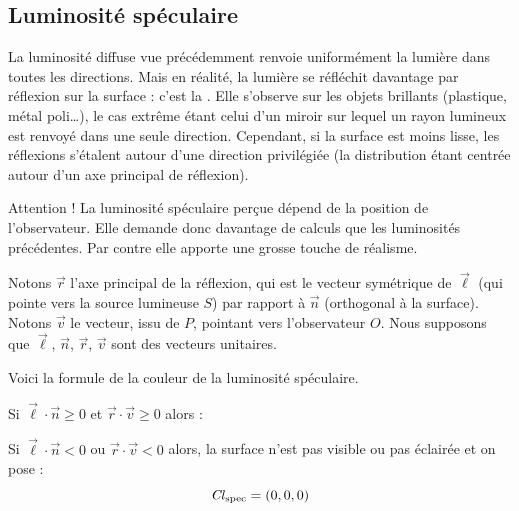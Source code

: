 \documentclass[11pt,class=report,crop=false]{standalone}
\begin{document}
\subsection{Luminosité spéculaire}


La luminosité diffuse vue précédemment renvoie uniformément la lumière dans toutes les directions. Mais en réalité, la lumière se réfléchit davantage par réflexion sur la surface : c'est la .
Elle s'observe sur les objets brillants (plastique, métal poli\ldots), le cas extrême étant celui d'un miroir sur lequel un rayon lumineux est renvoyé dans une seule direction. Cependant, si la surface est moins lisse, les réflexions s'étalent autour d'une direction privilégiée (la distribution étant centrée autour d'un axe principal de réflexion).



Attention ! La luminosité spéculaire perçue dépend de la position de l'observateur. Elle demande donc davantage de calculs que les luminosités précédentes. Par contre elle apporte une grosse touche de réalisme.

Notons $\vec r$ l'axe principal de la réflexion, qui est le vecteur symétrique de $\vec\ell$ (qui pointe vers la source lumineuse $S$) par rapport à $\vec n$ (orthogonal à la surface). Notons $\vec{v}$ le vecteur, issu de $P$, pointant vers l'observateur $O$.
Nous supposons que $\vec{\ell}$, $\vec{n}$, $\vec{r}$, $\vec{v}$ sont des vecteurs unitaires.



\begin{lemme}
\label{lem:vecr}
\sauteligne
{}
\end{lemme}


Voici la formule de la couleur de la luminosité spéculaire.

Si $\vec\ell \cdot \vec n \ge 0$ et $\vec r \cdot \vec v \ge 0$ alors :

Si $\vec\ell \cdot \vec n < 0$ ou $\vec r \cdot \vec v < 0$ alors, la surface n'est pas visible ou pas éclairée et on pose :
$$\displaystyle \operatorname{\it Cl}_{\text{spec}} = (0,0,0)$$
\end{document}
